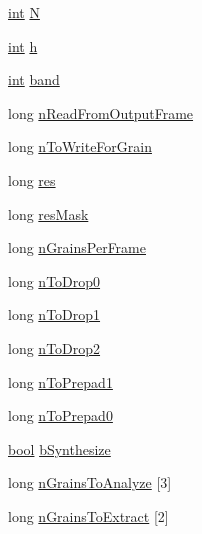 \begin{DoxyCompactItemize}
\item 
\hyperlink{xmltok_8h_a5a0d4a5641ce434f1d23533f2b2e6653}{int} \hyperlink{class__sbsms___1_1_sub_band_a6c2be741d9cf251ba1c406b82e9a7c48}{N}
\item 
\hyperlink{xmltok_8h_a5a0d4a5641ce434f1d23533f2b2e6653}{int} \hyperlink{class__sbsms___1_1_sub_band_a169a48f21a5f3f3a1d33601b1e8a8806}{h}
\item 
\hyperlink{xmltok_8h_a5a0d4a5641ce434f1d23533f2b2e6653}{int} \hyperlink{class__sbsms___1_1_sub_band_a865ef147bdcfecee221ae3eb84aa54d2}{band}
\item 
long \hyperlink{class__sbsms___1_1_sub_band_a6e22bf535e2cd08424463ab47340ac24}{n\+Read\+From\+Output\+Frame}
\item 
long \hyperlink{class__sbsms___1_1_sub_band_a173e3f56ec7a5163b2967c1c6694b4a4}{n\+To\+Write\+For\+Grain}
\item 
long \hyperlink{class__sbsms___1_1_sub_band_afc3876743fce8b87d1f59445126acf02}{res}
\item 
long \hyperlink{class__sbsms___1_1_sub_band_a37b04cc87c94135320ecef3d67f56ba5}{res\+Mask}
\item 
long \hyperlink{class__sbsms___1_1_sub_band_af6465a1ec67cfb77f2d99ee9ed1bf660}{n\+Grains\+Per\+Frame}
\item 
long \hyperlink{class__sbsms___1_1_sub_band_a9a149ced3197377d2549c6c028f4d979}{n\+To\+Drop0}
\item 
long \hyperlink{class__sbsms___1_1_sub_band_a0952adca9b1d49661ffd621b960f19be}{n\+To\+Drop1}
\item 
long \hyperlink{class__sbsms___1_1_sub_band_a21a314ec07891cf67531ba3767b4f9c4}{n\+To\+Drop2}
\item 
long \hyperlink{class__sbsms___1_1_sub_band_a9193fa388ed4637d6583982001e271e5}{n\+To\+Prepad1}
\item 
long \hyperlink{class__sbsms___1_1_sub_band_a298d1d8b8263bf4ebdcbf84b08b7ed5c}{n\+To\+Prepad0}
\item 
\hyperlink{mac_2config_2i386_2lib-src_2libsoxr_2soxr-config_8h_abb452686968e48b67397da5f97445f5b}{bool} \hyperlink{class__sbsms___1_1_sub_band_aed18bd90e1aa01d4b744ad43e3d52563}{b\+Synthesize}
\item 
long \hyperlink{class__sbsms___1_1_sub_band_ab803c0869c44c07fd8681c7e1eb8fa68}{n\+Grains\+To\+Analyze} \mbox{[}3\mbox{]}
\item 
long \hyperlink{class__sbsms___1_1_sub_band_a960ac229e4b3a36a5e1f16673d6fd6cd}{n\+Grains\+To\+Extract} \mbox{[}2\mbox{]}
\item 

\end{DoxyCompactItemize}
